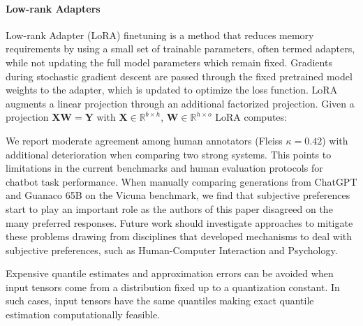 \paragraph{Low-rank Adapters} Low-rank Adapter (LoRA) finetuning \citep{hu2021lora} is a method that reduces memory requirements by using a small set of trainable parameters, often termed adapters, while not updating the full model parameters which remain fixed. Gradients during stochastic gradient descent are passed through the fixed pretrained model weights to the adapter, which is updated to optimize the loss function. LoRA augments a linear projection through an additional factorized projection. Given a projection ${\mathbf{X} \mathbf{W} = \mathbf{Y}}$ with $\mathbf{X}\in  \mathbb{R}^{b\times h}$, $\mathbf{W}\in  \mathbb{R}^{h\times o}$ LoRA computes:

We report moderate agreement among human annotators (Fleiss $\kappa=0.42$) with additional deterioration when comparing two strong systems. This points to limitations in the current benchmarks and human evaluation protocols for chatbot task performance. When manually comparing generations from ChatGPT and {Guanaco} 65B on the Vicuna benchmark, we find that subjective preferences start to play an important role as the authors of this paper disagreed on the many preferred responses. Future work should investigate approaches to mitigate these problems drawing from disciplines that developed mechanisms to deal with subjective preferences, such as Human-Computer Interaction and Psychology.

Expensive quantile estimates and approximation errors can be avoided when input tensors come from a distribution fixed up to a quantization constant. In such cases, input tensors have the same quantiles making exact quantile estimation computationally feasible.

